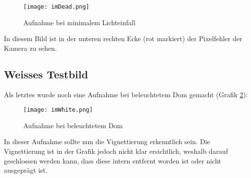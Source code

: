 \begin{figure}[ht]
	\centering
	\texttt{[image: imDead.png]}
	\caption{Aufnahme bei minimalem Lichteinfall}
	\label{fig::imDead}
\end{figure}

In diesem Bild ist in der unteren rechten Ecke (rot markiert) der Pixelfehler der Kamera zu sehen.
\newpage
\subsection{Weisses Testbild}
Als letztes wurde noch eine Aufnahme bei beleuchtetem Dom gemacht (Grafik \ref{fig::imWhite}):

\begin{figure}[!ht]
	\centering
	\texttt{[image: imWhite.png]}
	\caption{Aufnahme bei beleuchtetem Dom}
	\label{fig::imWhite}
\end{figure}

In dieser Aufnahme sollte nun die Vignettierung erkenntlich sein. Die Vignettierung ist in der Grafik jedoch nicht klar ersichtlich, weshalb darauf geschlossen werden kann, dass diese intern entfernt worden ist oder nicht ausgeprägt ist.




